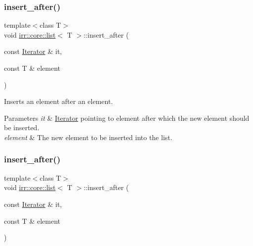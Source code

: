 \subsubsection{\texorpdfstring{insert\+\_\+after()}{insert\_after()}\hspace{0.1cm}{\footnotesize\ttfamily [1/2]}}
{\footnotesize\ttfamily template$<$class T$>$ \\
void \hyperlink{classirr_1_1core_1_1list}{irr\+::core\+::list}$<$ T $>$\+::insert\+\_\+after (\begin{DoxyParamCaption}\item[{const \hyperlink{classirr_1_1core_1_1list_1_1Iterator}{Iterator} \&}]{it,  }\item[{const T \&}]{element }\end{DoxyParamCaption})\hspace{0.3cm}{\ttfamily [inline]}}



Inserts an element after an element. 


\begin{DoxyParams}{Parameters}
{\em it} & \hyperlink{classirr_1_1core_1_1list_1_1Iterator}{Iterator} pointing to element after which the new element should be inserted. \\
\hline
{\em element} & The new element to be inserted into the list. \\
\hline
\end{DoxyParams}
\mbox{\label{classirr_1_1core_1_1list_aa4b91d7a9191fc98266425366b774c8a}} 
\subsubsection{\texorpdfstring{insert\+\_\+after()}{insert\_after()}\hspace{0.1cm}{\footnotesize\ttfamily [2/2]}}
{\footnotesize\ttfamily template$<$class T$>$ \\
void \hyperlink{classirr_1_1core_1_1list}{irr\+::core\+::list}$<$ T $>$\+::insert\+\_\+after (\begin{DoxyParamCaption}\item[{const \hyperlink{classirr_1_1core_1_1list_1_1Iterator}{Iterator} \&}]{it,  }\item[{const T \&}]{element }\end{DoxyParamCaption})\hspace{0.3cm}{\ttfamily [inline]}}



